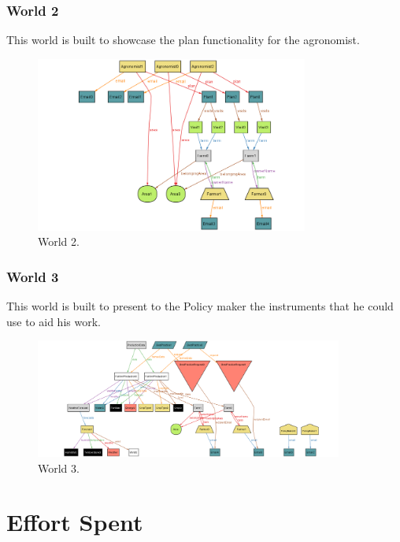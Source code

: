 \documentclass{article}
\begin{document}
\subsubsection{World 2}

This world is built to showcase the plan functionality for the agronomist.

    \begin{figure} [h]
        \centering
        \includegraphics[width=0.8\textwidth]{images/alloy/World2.png}
        \caption{\label{fig:frog}World 2.}
    \end{figure}

\subsubsection{World 3}

This world is built to present to the Policy maker the instruments that he could use to aid his work.

    \begin{figure} [h]
        \centering
        \includegraphics[width=0.9\textwidth]{images/alloy/World3.png}
        \caption{\label{fig:frog}World 3.}
    \end{figure}

\newpage




\section{Effort Spent}
\end{document}
